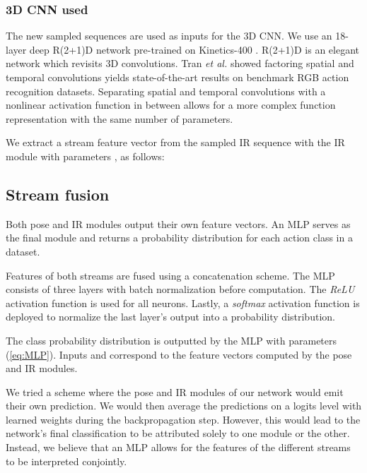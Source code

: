 \documentclass[letterpaper, 10 pt, conference]{ieeeconf}
\begin{document}
\subsubsection{3D CNN used}

The new sampled sequences are used as inputs for the 3D CNN. We use an 18-layer deep R(2+1)D network \cite{tran2018closer} pre-trained on Kinetics-400 \cite{carreira2017quo}. R(2+1)D is an elegant network which revisits 3D convolutions. Tran \textit{et al.} showed factoring spatial and temporal convolutions yields state-of-the-art results on benchmark RGB action recognition datasets. Separating spatial and temporal convolutions with a nonlinear activation function in between allows for a more complex function representation with the same number of parameters.

We extract a stream feature vector  from the sampled IR sequence  with the IR module  with parameters , as follows:



\subsection{Stream fusion}

Both pose and IR modules output their own feature vectors. An MLP serves as the final module and returns a probability distribution for each action class in a dataset. 

Features of both streams are fused using a concatenation scheme. The MLP consists of three layers with batch normalization \cite{ioffe2015batch} before computation. The \textit{ReLU} activation function is used for all neurons. Lastly, a \textit{softmax} activation function is deployed to normalize the last layer's output into a probability distribution. 

The class probability distribution  is outputted by the MLP   with parameters  (\ref{eq:MLP}). Inputs  and  correspond to the feature vectors computed by the pose and IR modules.



We tried a scheme where the pose and IR modules of our network would emit their own prediction. We would then average the predictions on a logits level with learned weights during the backpropagation step. However, this would lead to the network's final classification to be attributed solely to one module or the other. Instead, we believe that an MLP allows for the features of the different streams to be interpreted conjointly. 
\end{document}
